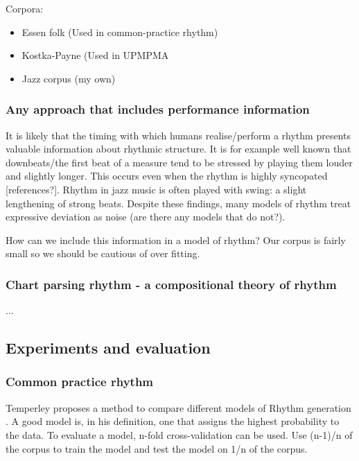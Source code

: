 \documentclass[a4paper,10pt]{article}
\begin{document}
Corpora:
\begin{itemize}
\item Essen folk (Used in common-practice rhythm)
\item Kostka-Payne (Used in UPMPMA
\item Jazz corpus (my own)
\end{itemize}

\subsubsection*{Any approach that includes performance information}


It is likely that the timing with which humans realise/perform a rhythm presents valuable information about rhythmic structure. It is for example well known that downbeats/the first beat of a measure tend to be stressed by playing them louder and slightly longer. This occurs even when the rhythm is highly syncopated [references?]. Rhythm in jazz music is often played with swing: a slight lengthening of strong beats. Despite these findings, many models of rhythm treat expressive deviation as noise (are there any models that do not?). 

How can we include this information in a model of rhythm? Our corpus is fairly small so we should be cautious of over fitting.

\subsubsection*{Chart parsing rhythm - a compositional theory of rhythm}

...

\subsection{Experiments and evaluation}


\subsubsection*{Common practice rhythm}
Temperley proposes a method to compare different models of Rhythm generation \citep{temperley2010modeling}. A good model is, in his definition, one that assigns the highest probability to the data. To evaluate a model, n-fold cross-validation can be used. Use (n-1)/n of the corpus to train the model and test the model on 1/n of the corpus. 
\end{document}
